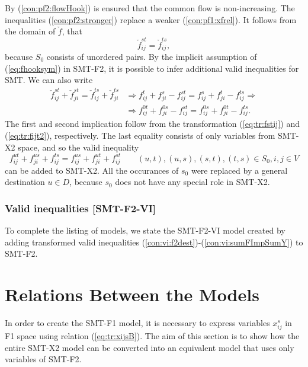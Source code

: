 By (\ref{con:pf2:flowHook}) is ensured that the common flow is non-increasing. The inequalities (\ref{con:pf2:stronger}) replace a weaker (\ref{con:pf1:xfrel}). It follows from the domain of $\check{f}$, that 
\begin{equation}
\label{eq:fhooksym}
\check{f}_{ij}^{st}=\check{f}_{ij}^{ts},
\end{equation}
because $S_0$ consists of unordered pairs. By the implicit assumption of (\ref{eq:fhooksym}) in SMT-F2, it is possible to infer additional valid inequalities for SMT. We can also write
\begin{align*}
\check{f}^{st}_{ij}+\check{f}^{st}_{ji}=\check{f}^{ts}_{ij}+\check{f}^{ts}_{ji} &\Rightarrow f^t_{ij}+f^s_{ji}-f^{st}_{ij}=f^s_{ij}+f^t_{ji}-f^{ts}_{ij}\Rightarrow \\ & \Rightarrow f^{0t}_{ij}+f^{0s}_{ji}-f^{st}_{ij}=f^{0s}_{ij}+f^{0t}_{ji}-f^{ts}_{ij}.
\end{align*}
The first and second implication follow from the transformation (\ref{eq:tr:fstij}) and (\ref{eq:tr:fijt2}), respectively. The last equality consists of only variables from SMT-X2  space, and so the valid inequality
\begin{equation*}f^{ut}_{ij}+f^{us}_{ji}+f^{ts}_{ij}=f^{us}_{ij}+f^{ut}_{ji}+f^{st}_{ij} \quad\quad (u,t),(u,s),(s,t),(t,s)\in S_0, i,j\in V
\end{equation*} 
can be added to  SMT-X2. All the occurances of $s_0$ were replaced by a general destination $u\in D$, because $s_0$ does not have any special role in SMT-X2.

\subsubsection{Valid inequalities [SMT-F2-VI]}

To complete the listing of models, we state the SMT-F2-VI model created by adding transformed valid inequalities (\ref{con:vi:f2dest})-(\ref{con:vi:sumFImpSumY}) to SMT-F2.

\section{Relations Between the Models}
\label{sec:comp}
In order to create the SMT-F1 model, it is necessary to express variables  $x^s_{ij}$ in F1 space using relation (\ref{eq:tr:xijsB}). The aim of this section is to show how the entire SMT-X2 model can be converted into an equivalent model that uses only variables of SMT-F2. 

